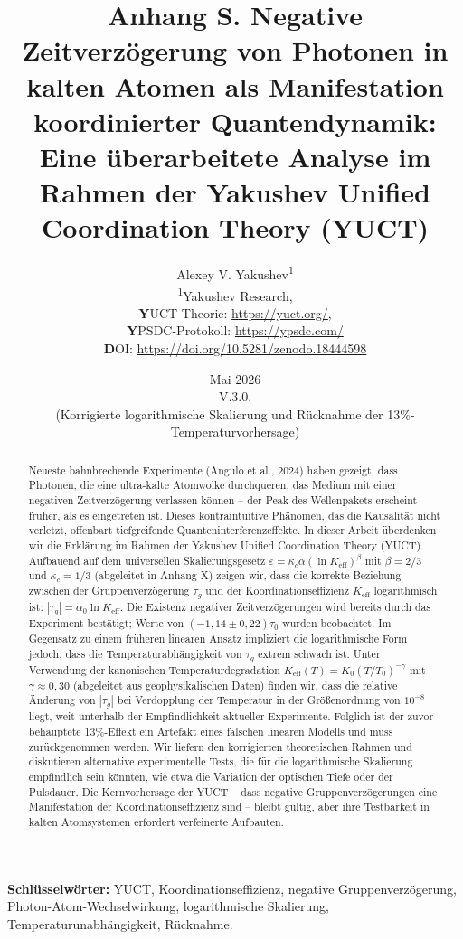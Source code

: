 \documentclass[12pt,a4paper]{article}
\title{\textbf{Anhang S. Negative Zeitverzögerung von Photonen in kalten Atomen als Manifestation koordinierter Quantendynamik: \\ Eine überarbeitete Analyse im Rahmen der Yakushev Unified Coordination Theory (YUCT)}}
\author{Alexey V. Yakushev\textsuperscript{1} \\
	\textsuperscript{1}Yakushev Research, \\ 
	\textbf YUCT-Theorie: \url{https://yuct.org/}, \\ 
	\textbf YPSDC-Protokoll: \url{https://ypsdc.com/}\\
	\textbf DOI: \url{https://doi.org/10.5281/zenodo.18444598}\\
}
\date{Mai 2026 \\ \large V.3.0. \\(Korrigierte logarithmische Skalierung und Rücknahme der 13\%-Temperaturvorhersage)}
\newcommand{\Keff}{K_{\mathrm{eff}}}
\newcommand{\kappac}{\kappa_c}
\newcommand{\eps}{\varepsilon}
\newcommand{\betac}{\beta}
\begin{document}
	
	\maketitle
	\newpage
	\begin{abstract}
		Neueste bahnbrechende Experimente (Angulo et al., 2024) haben gezeigt, dass Photonen, die eine ultra-kalte Atomwolke durchqueren, das Medium mit einer negativen Zeitverzögerung verlassen können – der Peak des Wellenpakets erscheint früher, als es eingetreten ist. Dieses kontraintuitive Phänomen, das die Kausalität nicht verletzt, offenbart tiefgreifende Quanteninterferenzeffekte. In dieser Arbeit überdenken wir die Erklärung im Rahmen der Yakushev Unified Coordination Theory (YUCT). Aufbauend auf dem universellen Skalierungsgesetz \(\eps = \kappac \alpha (\ln\Keff)^{\betac}\) mit \(\betac = 2/3\) und \(\kappac = 1/3\) (abgeleitet in Anhang X) zeigen wir, dass die korrekte Beziehung zwischen der Gruppenverzögerung \(\tau_g\) und der Koordinationseffizienz \(\Keff\) logarithmisch ist: \(|\tau_g| = \alpha_0 \ln\Keff\). Die Existenz negativer Zeitverzögerungen wird bereits durch das Experiment bestätigt; Werte von \((-1,14 \pm 0,22)\tau_0\) wurden beobachtet. Im Gegensatz zu einem früheren linearen Ansatz impliziert die logarithmische Form jedoch, dass die Temperaturabhängigkeit von \(\tau_g\) extrem schwach ist. Unter Verwendung der kanonischen Temperaturdegradation \(\Keff(T) = K_0 (T/T_0)^{-\gamma}\) mit \(\gamma \approx 0,30\) (abgeleitet aus geophysikalischen Daten) finden wir, dass die relative Änderung von \(|\tau_g|\) bei Verdopplung der Temperatur in der Größenordnung von \(10^{-8}\) liegt, weit unterhalb der Empfindlichkeit aktueller Experimente. Folglich ist der zuvor behauptete 13\%-Effekt ein Artefakt eines falschen linearen Modells und muss zurückgenommen werden. Wir liefern den korrigierten theoretischen Rahmen und diskutieren alternative experimentelle Tests, die für die logarithmische Skalierung empfindlich sein könnten, wie etwa die Variation der optischen Tiefe oder der Pulsdauer. Die Kernvorhersage der YUCT – dass negative Gruppenverzögerungen eine Manifestation der Koordinationseffizienz sind – bleibt gültig, aber ihre Testbarkeit in kalten Atomsystemen erfordert verfeinerte Aufbauten.
	\end{abstract}
	
	\noindent\textbf{Schlüsselwörter:} YUCT, Koordinationseffizienz, negative Gruppenverzögerung, Photon-Atom-Wechselwirkung, logarithmische Skalierung, Temperaturunabhängigkeit, Rücknahme.
	
\end{document}
